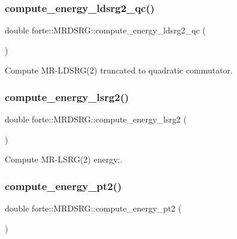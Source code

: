 \subsubsection{\texorpdfstring{compute\+\_\+energy\+\_\+ldsrg2\+\_\+qc()}{compute\_energy\_ldsrg2\_qc()}}
{\footnotesize\ttfamily double forte\+::\+M\+R\+D\+S\+R\+G\+::compute\+\_\+energy\+\_\+ldsrg2\+\_\+qc (\begin{DoxyParamCaption}{ }\end{DoxyParamCaption})\hspace{0.3cm}{\ttfamily [protected]}}



Compute M\+R-\/\+L\+D\+S\+RG(2) truncated to quadratic commutator. 

\mbox{\label{classforte_1_1_m_r_d_s_r_g_aa6ecb7dedfe3e94202323f346f6a3520}} 
\subsubsection{\texorpdfstring{compute\+\_\+energy\+\_\+lsrg2()}{compute\_energy\_lsrg2()}}
{\footnotesize\ttfamily double forte\+::\+M\+R\+D\+S\+R\+G\+::compute\+\_\+energy\+\_\+lsrg2 (\begin{DoxyParamCaption}{ }\end{DoxyParamCaption})\hspace{0.3cm}{\ttfamily [protected]}}



Compute M\+R-\/\+L\+S\+RG(2) energy;. 

\mbox{\label{classforte_1_1_m_r_d_s_r_g_aa714d4ae7983e22ca4cbe172cb986849}} 
\subsubsection{\texorpdfstring{compute\+\_\+energy\+\_\+pt2()}{compute\_energy\_pt2()}}
{\footnotesize\ttfamily double forte\+::\+M\+R\+D\+S\+R\+G\+::compute\+\_\+energy\+\_\+pt2 (\begin{DoxyParamCaption}{ }\end{DoxyParamCaption})\hspace{0.3cm}{\ttfamily [protected]}}



